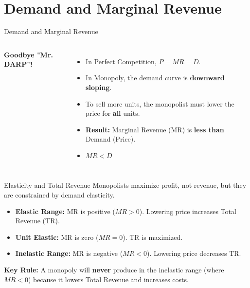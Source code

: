 \documentclass[aspectratio=169, 10pt]{beamer}
\begin{document}
\section{Demand and Marginal Revenue}

\begin{frame}{Demand and Marginal Revenue}
    \begin{columns}
        \textbf{Goodbye "Mr. DARP"!}
        \begin{itemize}
            \item In Perfect Competition, $P = MR = D$.
            \item In Monopoly, the demand curve is \textbf{downward sloping}.
            \item To sell more units, the monopolist must lower the price for \textbf{all} units.
            \item \textbf{Result:} Marginal Revenue (MR) is \textbf{less than} Demand (Price).
            \item $MR < D$
        \end{itemize}

        \begin{center}
        \end{center}
    \end{columns}
\end{frame}

\begin{frame}{Elasticity and Total Revenue}
    Monopolists maximize profit, not revenue, but they are constrained by demand elasticity.
    \vspace{0.3cm}
    \begin{itemize}
        \item \textbf{Elastic Range:} MR is positive ($MR > 0$). Lowering price increases Total Revenue (TR).
        \item \textbf{Unit Elastic:} MR is zero ($MR = 0$). TR is maximized.
        \item \textbf{Inelastic Range:} MR is negative ($MR < 0$). Lowering price decreases TR.
    \end{itemize}
    \vspace{0.3cm}
    \textbf{Key Rule:} A monopoly will \textbf{never} produce in the inelastic range (where $MR < 0$) because it lowers Total Revenue and increases costs.
\end{frame}
\end{document}
